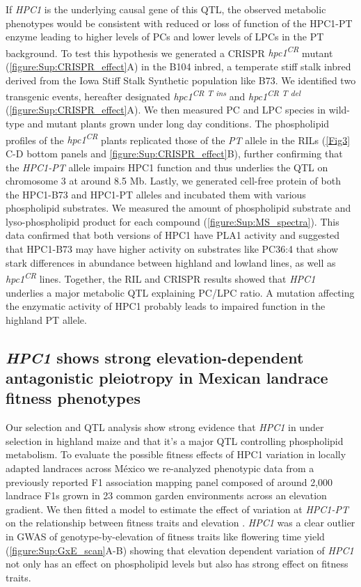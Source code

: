 \documentclass[9pt,twocolumn,twoside,lineno]{biorxiv}
\newcommand{\hpc}{\textit{HPC1}\xspace}
\begin{document}
If \hpc is the underlying causal gene of this QTL, the observed metabolic phenotypes would be consistent with reduced or loss of function of the HPC1-PT enzyme leading to higher levels of PCs and lower levels of LPCs in the PT background. 
To test this hypothesis we generated a CRISPR \textit{hpc1\textsuperscript{CR}} mutant (\cref{figure:Sup:CRISPR_effect}A) in the B104 inbred, a temperate stiff stalk inbred derived from the Iowa Stiff Stalk Synthetic population like B73. 
We identified two transgenic events, hereafter designated \textit{hpc1\textsuperscript{CR T ins}} and \textit{hpc1\textsuperscript{CR T del}} (\cref{figure:Sup:CRISPR_effect}A).
We then measured PC and LPC species in wild-type and mutant plants grown under long day conditions.  
The phospholipid profiles of the \textit{hpc1\textsuperscript{CR}} plants 
replicated those of the \textit{PT} allele in the RILs (\cref{Fig3} C-D bottom panels and \cref{figure:Sup:CRISPR_effect}B), further confirming that the \textit{HPC1-PT} allele impairs HPC1 function and thus underlies the QTL on chromosome 3 at around 8.5 Mb. 
Lastly, we generated cell-free protein of both the HPC1-B73 and HPC1-PT alleles and incubated them with various phospholipid substrates. 
We measured the amount of phospholipid substrate and lyso-phospholipid product for each compound (\cref{figure:Sup:MS_spectra}). 
This data confirmed that both versions of HPC1 have PLA1 activity and suggested that HPC1-B73 may have higher activity on substrates like PC36:4 that show stark differences in abundance between highland and lowland lines, as well as \textit{hpc1\textsuperscript{CR}} lines.
Together, the RIL and CRISPR results showed that \hpc underlies a major metabolic QTL explaining PC/LPC ratio. 
A mutation affecting the enzymatic activity of HPC1 probably leads to impaired function in the highland PT allele.
\subsection{\hpc shows strong elevation-dependent antagonistic pleiotropy in Mexican landrace fitness phenotypes}
Our selection and QTL analysis show strong evidence that \hpc in under selection in highland maize and that it's a major QTL controlling phospholipid metabolism. 
To evaluate the possible fitness effects of HPC1 variation in locally adapted landraces across M\'exico we re-analyzed phenotypic data from a previously reported F1 association mapping panel \cite{Romero_Navarro2017-cn, Gates2019-xu} composed of around 2,000 landrace F1s grown in 23 common garden environments across an elevation gradient.  
We then fitted a model to estimate the effect of variation at \textit{HPC1-PT} on the relationship between fitness traits and elevation \cite{Runcie2019-Gr}.
\hpc was a clear outlier in GWAS of genotype-by-elevation of fitness traits like flowering time yield (\cref{figure:Sup:GxE_scan}A-B) showing that elevation dependent variation of \hpc not only has an effect on phospholipid levels but also has strong effect on fitness traits.
\end{document}
